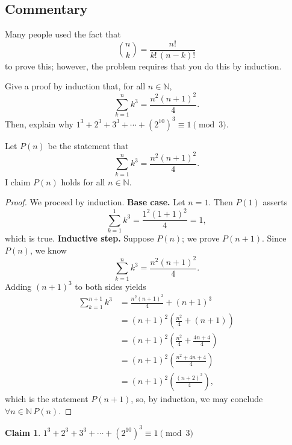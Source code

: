 \documentclass[12pt]{midterm}
\newtheorem*{claim}{Claim}
\begin{document}
\begin{exam}
\begin{solution}
\begin{solutiontext}
\color{magenta!50!black}
\vfill
\setlength{\leftskip}{0in}
\subsection*{Commentary}

Many people used the fact that
$$
\binom{n}{k} = \frac{n!}{k! \, (n-k)!}
$$
to prove this; however, the problem requires that you do this by induction.

\end{solutiontext}\end{solution}

\begin{problem}[360]
Give a proof by induction that, for all $n \in \mathbb{N}$,
$$
\sum_{k=1}^n k^3 = \frac{n^2 (n+1)^2}{4}.
$$
Then, explain why $1^3 + 2^3 + 3^3 + \cdots + (2^{10})^3 \equiv 1 \pmod 3$.
\end{problem}

\begin{solution}\begin{solutiontext}

Let $P(n)$ be the statement that
$$
\sum_{k=1}^n k^3 = \frac{n^2 (n+1)^2}{4}.
$$
I claim $P(n)$ holds for all $n \in \mathbb{N}$.
\begin{proof}
  We proceed by induction.  \textbf{Base case.}  Let $n = 1$.  Then $P(1)$ asserts
$$
\sum_{k=1}^1 k^3 = \frac{1^2 (1+1)^2}{4} = 1,
$$
which is true.  \textbf{Inductive step.}  Suppose $P(n)$; we prove $P(n+1)$.  Since $P(n)$, we know
$$
\sum_{k=1}^n k^3 = \frac{n^2 (n+1)^2}{4}.
$$
Adding $(n+1)^3$ to both sides yields
\begin{align*}
\sum_{k=1}^{n+1} k^3
&= \frac{n^2 (n+1)^2}{4} + (n+1)^3 \\
&= \left( n+1 \right)^2 \left( \frac{n^2}{4} + (n+1) \right) \\
&= \left( n+1 \right)^2 \left( \frac{n^2}{4} + \frac{4n+4}{4} \right) \\
&= \left( n+1 \right)^2 \left( \frac{n^2 + 4n + 4}{4} \right) \\
&= \left( n+1 \right)^2 \left( \frac{(n+2)^2}{4} \right),
\end{align*}
which is the statement $P(n+1)$, so, by induction, we may conclude $\forall n \in \mathbb{N}\, P(n)$.
\end{proof}

\pagebreak

\begin{claim}
  $1^3 + 2^3 + 3^3 + \cdots + (2^{10})^3 \equiv 1 \pmod 3$
\end{claim}


\end{solutiontext}
\end{solution}
\end{exam}
\end{document}
